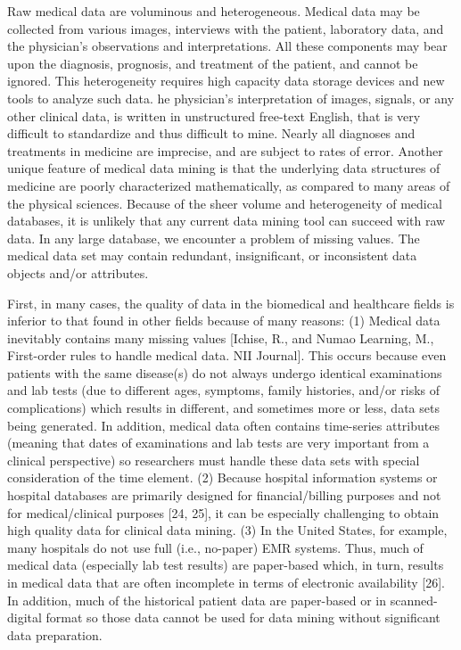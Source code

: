 \documentclass[10pt,a4paper]{article}
\begin{document}
	Raw medical data are voluminous and heterogeneous. Medical data may be collected from various images, interviews with the patient, laboratory data, and the physician’s observations and interpretations. All these components may bear upon the diagnosis, prognosis, and treatment of the patient, and cannot be ignored.  This heterogeneity requires high capacity data storage devices and new tools to analyze such data. he physician’s interpretation of images, signals, or any other clinical data, is written in unstructured free-text English, that is very difficult to standardize and thus difficult to mine. Nearly all diagnoses and treatments in medicine are imprecise, and are subject to rates of error. Another unique feature of medical data mining is that the underlying data structures of medicine are poorly characterized mathematically, as compared to many areas of the physical sciences. Because of the sheer volume and heterogeneity of medical databases, it is unlikely that any current data mining tool can succeed with raw data. In any large database, we encounter a problem of missing values. The medical data set may contain redundant, insignificant, or inconsistent data objects and/or attributes. \cite{CIOS20021}
	
	First, in many cases, the quality of data in the biomedical and healthcare fields is inferior to that found in other fields because of many reasons: (1) Medical data inevitably contains many missing values [Ichise, R., and Numao Learning, M., First-order rules to handle medical data. NII Journal]. This occurs because even patients with the same disease(s) do not always undergo identical examinations and lab tests (due to different ages, symptoms, family histories, and/or risks of complications) which results in different, and sometimes more or less, data sets being generated. In addition, medical data often contains time-series attributes (meaning that dates of examinations and lab tests are very important from a clinical perspective) so researchers must handle these data sets with special consideration of the time element. (2) Because hospital information systems or hospital databases are primarily designed for financial/billing purposes and not for medical/clinical purposes [24, 25], it can be especially challenging to obtain high quality data for clinical data mining. (3) In the United States, for example, many hospitals do not use full (i.e., no-paper) EMR systems. Thus, much of medical data (especially lab test results) are paper-based which, in turn, results in medical data that are often incomplete in terms of electronic availability [26]. In addition, much of the historical patient data are paper-based or in scanned-digital format so those data cannot be used for data mining without significant data preparation. \cite{Yoo2012}
	
\end{document}
